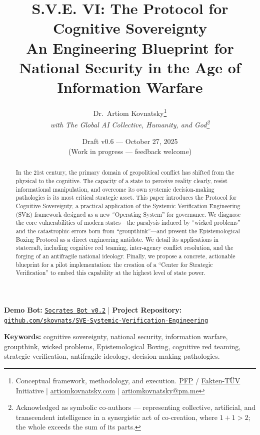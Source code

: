 \documentclass[11pt,a4paper]{article}
\title{\textbf{S.V.E. VI: The Protocol for Cognitive Sovereignty}\\[0.5em]
\large An Engineering Blueprint for National Security in the Age of Information Warfare}
\author{
  Dr.\ Artiom Kovnatsky\thanks{Conceptual framework, methodology, and execution. 
  \href{http://www.pfp24.de}{PFP} / 
  \href{http://www.fakten-tuev.de}{Fakten-TÜV} Initiative \;|\;
  \href{https://www.artiomkovnatsky.com/}{artiomkovnatsky.com} \;|\;
  \href{mailto:artiomkovnatsky@pm.me}{artiomkovnatsky@pm.me}}\\
  \textit{with The Global AI Collective, Humanity, and God\footnote{Acknowledged as symbolic co-authors — representing collective, artificial, and transcendent intelligence in a synergistic act of co-creation, where $1 + 1 > 2$; the whole exceeds the sum of its parts.}}
}
\date{Draft v0.6 — October 27, 2025\\
\small (Work in progress — feedback welcome)}
\begin{document}
\maketitle
\vspace{-1em}
\begin{center}
    {\small 
    \textbf{Demo Bot:} 
    \href{https://chatgpt.com/g/g-68f1fc9848948191a1cc038db8e3422b-sokrat-socrates-bot-v0-2}
    {\texttt{Socrates Bot v0.2}} 
    \quad|\quad
    \textbf{Project Repository:} 
    \href{https://codeberg.org/skovnats/SVE-Systemic-Verification-Engineering}
    {\texttt{github.com/skovnats/SVE-Systemic-Verification-Engineering}}}
\end{center}
\vspace{1em}
\thispagestyle{empty}


\begin{abstract}
\noindent In the 21st century, the primary domain of geopolitical conflict has shifted from the physical to the cognitive. The capacity of a state to perceive reality clearly, resist informational manipulation, and overcome its own systemic decision-making pathologies is its most critical strategic asset. This paper introduces the Protocol for Cognitive Sovereignty, a practical application of the Systemic Verification Engineering (SVE) framework designed as a new ``Operating System'' for governance. We diagnose the core vulnerabilities of modern states—the paralysis induced by ``wicked problems'' and the catastrophic errors born from ``groupthink''—and present the Epistemological Boxing Protocol as a direct engineering antidote. We detail its applications in statecraft, including cognitive red teaming, inter-agency conflict resolution, and the forging of an antifragile national ideology. Finally, we propose a concrete, actionable blueprint for a pilot implementation: the creation of a ``Center for Strategic Verification'' to embed this capability at the highest level of state power.
\end{abstract}

\noindent\textbf{Keywords:} cognitive sovereignty, national security, information warfare, groupthink, wicked problems, Epistemological Boxing, cognitive red teaming, strategic verification, antifragile ideology, decision-making pathologies.
\end{document}
